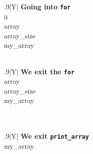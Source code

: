\documentclass[a4paper]{article}
\begin{document}
\begin{table}[H]
    \begin{subfigure}{0.33333\linewidth}
        \centering
        \begin{tabularx}{.9\linewidth}{|Y|}
        \hline
        \textbf{Going into \texttt{for}}\\\hline
        ii \\\hline
        array\\\hline
        array\_size\\\hline
        my\_array\\\hline
        \\ \hline
        \end{tabularx}
    \end{subfigure}%
    \begin{subfigure}{0.33333\linewidth}
        \centering
        \begin{tabularx}{.9\linewidth}{|Y|}
        \hline
        \textbf{We exit the \texttt{for}}\\\hline
        array\\\hline
        array\_size\\\hline
        my\_array\\\hline
        \\ \hline
        \\ \hline
        \end{tabularx}
    \end{subfigure}%
    \begin{subfigure}{0.33333\linewidth}
        \centering
        \begin{tabularx}{.9\linewidth}{|Y|}
        \hline
        \textbf{We exit \texttt{print\_array}} \\\hline
        my\_array\\\hline
        \\ \hline
        \\ \hline
        \\ \hline
        \\ \hline
        \end{tabularx}
    \end{subfigure}%


\end{table}
\end{document}
